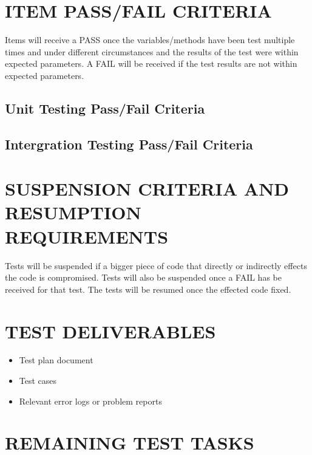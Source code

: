 {{\section[ITEM PASS/FAIL CRITERIA]{\bfseries\color{black}
	 ITEM PASS/FAIL CRITERIA}
{\color{black}
Items will receive a PASS once the variables/methods have been test multiple times and under different circumstances and the results of the test were within expected parameters. A FAIL will be received if the test results are not within expected parameters. 
}

\subsection{Unit Testing Pass/Fail Criteria}
\subsection{Intergration Testing Pass/Fail Criteria}




\section[SUSPENSION CRITERIA]{\bfseries\color{black}
	 SUSPENSION CRITERIA AND RESUMPTION REQUIREMENTS}
{\color{black}

{\color{black}
Tests will be suspended if a bigger piece of code that directly or indirectly effects the code is compromised. Tests will also be suspended once a FAIL has be received for that test. The tests will be resumed once the effected code fixed. 
}

\section[TEST DELIVERABLES]{\bfseries\color{black} TEST DELIVERABLES}

{\color{black}
\begin{itemize}
\item Test plan document
\item Test cases
\item Relevant error logs or problem reports
\end{itemize}
}

\section[REMAINING TEST TASKS]{\bfseries\color{black} REMAINING TEST TASKS}

}}}
